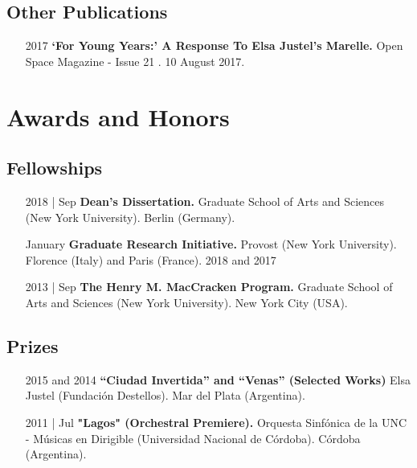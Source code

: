 \documentclass[12pt,overlapped]{res}%
\begin{document}
\begin{resume}
\subsection{Other Publications}%
\fullline%
\begin{itemize}[align=parleft,leftmargin=2.25cm,labelwidth=2cm]
\item[2017]
\textbf{`For Young Years:' A Response To Elsa Justel's Marelle.}
Open Space Magazine {-} Issue 21 . 
10 August 2017.
\end{itemize}


\section{Awards and Honors}%
\label{sec:AwardsandHonors}%
\subsection{Fellowships}%
\fullline%
\begin{itemize}[align=parleft,leftmargin=2.25cm,labelwidth=2cm]
\item[2018 | Sep]
\textbf{Dean's Dissertation.}
Graduate School of Arts and Sciences (New York University). 
Berlin (Germany). 
\end{itemize}%
\begin{itemize}[align=parleft,leftmargin=2.25cm,labelwidth=2cm]
\item[January]
\textbf{Graduate Research Initiative.}
Provost (New York University). 
Florence (Italy) and Paris (France). 
2018 and 2017
\end{itemize}%
\begin{itemize}[align=parleft,leftmargin=2.25cm,labelwidth=2cm]
\item[2013 | Sep]
\textbf{The Henry M. MacCracken Program.}
Graduate School of Arts and Sciences (New York University). 
New York City (USA). 
\end{itemize}%
\subsection{Prizes}%
\fullline%
\begin{itemize}[align=parleft,leftmargin=2.25cm,labelwidth=2cm]
\item[2015 and 2014]
\textbf{``Ciudad Invertida'' and ``Venas'' (Selected Works)}
Elsa Justel (Fundación Destellos). 
Mar del Plata (Argentina). 
\end{itemize}%
\begin{itemize}[align=parleft,leftmargin=2.25cm,labelwidth=2cm]
\item[2011 | Jul]
\textbf{"Lagos" (Orchestral Premiere).}
Orquesta Sinfónica de la UNC {-} Músicas en Dirigible (Universidad Nacional de Córdoba). 
Córdoba (Argentina). 
\end{itemize}%

\end{resume}
\end{document}
